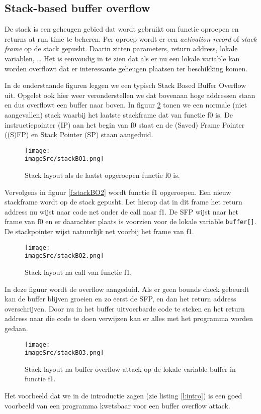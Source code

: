\documentclass[../main.tex]{subfiles}
\begin{document}
\subsection{Stack-based buffer overflow}
De stack is een geheugen gebied dat wordt gebruikt om functie oproepen en returns at run time te beheren.
Per oproep wordt er een \emph{activation record} of \emph{stack frame} op de stack gepusht. Daarin zitten parameters, return address, lokale variablen, \ldots
Het is eenvoudig in te zien dat als er nu een lokale variable kan worden overflowt dat er interessante geheugen plaatsen ter beschikking komen.

In de onderstaande figuren leggen we een typisch Stack Based Buffer Overflow uit. Opgelet ook hier weer veronderstellen we dat bovenaan hoge addressen staan en dus overflowt een buffer naar boven.
In figuur \ref{f:stackBO1} tonen we een normale (niet aangevallen) stack waarbij het laatste stackframe dat van functie f0 is. De instructiepointer (IP) aan het begin van f0 staat en de (Saved) Frame Pointer ((S)FP) en Stack Pointer (SP) staan aangeduid.
\begin{figure}
\centering
\texttt{[image: \\imageSrc/stackBO1.png]}
\caption{Stack layout als de laatst opgeroepen functie f0 is.}
\label{f:stackBO1}
\end{figure}

Vervolgens in figuur \ref{f:stackBO2} wordt functie f1 opgeroepen. Een nieuw stackframe wordt op de stack gepusht. Let hierop dat in dit frame het return address nu wijst naar code net onder de call naar f1. De SFP wijst naar het frame van f0 en er daarachter plaats is voorzien voor de lokale variable \lstinline[style=cstyle]{buffer[]}. De stackpointer wijst natuurlijk net voorbij het frame van f1.
\begin{figure}
\centering
\texttt{[image: \\imageSrc/stackBO2.png]}
\caption{Stack layout na call van functie f1.}
\label{f:stackBO1}
\end{figure}

In deze figuur wordt de overflow aangeduid. Als er geen bounds check gebeurdt kan de buffer blijven groeien en zo eerst de SFP, en dan het return address overschrijven. Door nu in het buffer uitvoerbarde code te steken en het return address naar die code te doen verwijzen kan er alles met het programma worden gedaan.
\begin{figure}
\centering
\texttt{[image: \\imageSrc/stackBO3.png]}
\caption{Stack layout na buffer overflow attack op de lokale variable buffer in functie f1.}
\label{f:stackBO3}
\end{figure}
Het voorbeeld dat we in de introductie zagen (zie listing \ref{l:intro}) is een goed voorbeeld van een programma kwetsbaar voor een buffer overflow attack.
\end{document}
